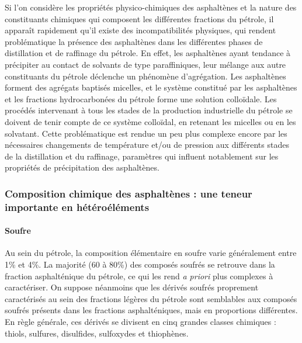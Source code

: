 Si l'on considère les propriétés physico-chimiques des asphaltènes et la nature des constituants chimiques qui composent les différentes fractions du pétrole, il apparaît rapidement qu'il existe des incompatibilités physiques, qui rendent problématique la présence des asphaltènes dans les différentes phases de distillation et de raffinage du pétrole. En effet, les asphaltènes ayant tendance à précipiter au contact de solvants de type paraffiniques, leur mélange aux autre constituants du pétrole déclenche un phénomène d'agrégation. Les asphaltènes forment des agrégats baptisés micelles, et le système constitué par les asphaltènes et les fractions hydrocarbonées du pétrole forme une solution colloïdale. Les procédés intervenant à tous les stades de la production industrielle du pétrole se doivent de tenir compte de ce système colloïdal, en retenant les micelles ou en les solvatant. Cette problématique est rendue un peu plus complexe encore par les nécessaires changements de température et/ou de pression aux différents stades de la distillation et du raffinage, paramètres qui influent notablement sur les propriétés de précipitation des asphaltènes. 

\subsubsection{Composition chimique des asphaltènes : une teneur importante en hétéroéléments}

\paragraph{Soufre}

Au sein du pétrole, la composition élémentaire en soufre varie généralement entre 1\% et 4\%. La majorité (60 à 80\%) des composés soufrés se retrouve dans la fraction asphalténique du pétrole, ce qui les rend \textit{a priori} plus complexes à caractériser. On suppose néanmoins que les dérivés soufrés proprement caractérisés au sein des fractions légères du pétrole sont semblables aux composés soufrés présents dans les fractions asphalténiques, mais en proportions différentes. 
En règle générale, ces dérivés se divisent en cinq grandes classes chimiques : thiols, sulfures, disulfides, sulfoxydes et thiophènes. 


